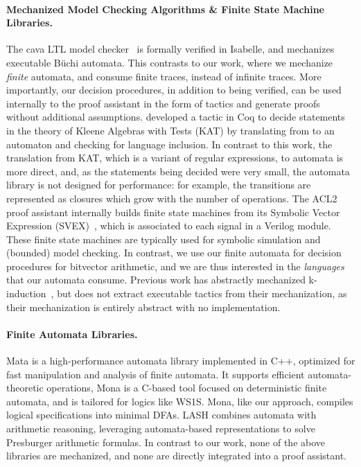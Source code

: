 \paragraph{Mechanized Model Checking Algorithms \& Finite State Machine Libraries.}
The cava LTL model checker~\cite{gregoire2005proving} is formally verified in Isabelle,
and mechanizes executable B\"uchi automata.
This contrasts to our work, where we mechanize \emph{finite} automata,
and consume finite traces, instead of infinite traces.
%
More importantly, our decision procedures, in addition to being verified, can be
used internally to the proof assistant in the form of tactics and generate
proofs without additional assumptions.
%
\citet{kat-pous} developed a tactic in Coq to decide statements in the theory of
Kleene Algebras with Tests (KAT) by translating from to an automaton and
checking for language inclusion.
%
In contrast to this work, the translation from KAT, which is a variant of
regular expressions, to automata is more direct, and, as the statements being
decided were very small, the automata library is not designed for performance:
for example, the transitions are represented as closures which grow with the
number of operations.
%
The ACL2 proof assistant internally builds finite state machines from its
Symbolic Vector Expression (SVEX)~\cite{hunt2017industrial}, which is associated to each signal in a Verilog module.
These finite state machines are typically used for symbolic simulation and (bounded) model checking.
In contrast, we use our finite automata for decision procedures for bitvector arithmetic,
and we are thus interested in the \emph{languages} that our automata consume.
Previous work has abstractly mechanized k-induction~\cite{ishii2020formalizing},
but does not extract executable tactics from their mechanization,
as their mechanization is entirely abstract with no implementation.

\paragraph{Finite Automata Libraries.}
Mata \cite{chocholaty2024mata} is a high-performance automata library implemented in C++, optimized for fast manipulation and analysis of finite automata. It supports efficient automata-theoretic operations,
Mona \cite{henriksen1995mona} is a C-based tool focused on deterministic finite automata, and is tailored for logics like WS1S. Mona, like our approach, compiles logical specifications into minimal DFAs.
LASH \cite{boigelot2004counting} combines automata with arithmetic reasoning, leveraging automata-based representations to solve Presburger arithmetic formulas.
In contrast to our work, none of the above libraries are mechanized, and none are directly integrated into a proof assistant.


